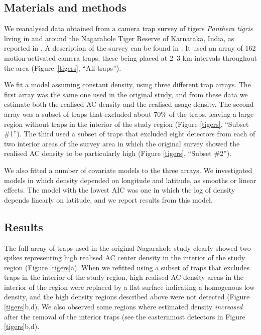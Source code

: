 \documentclass[useAMS,usenatbib,referee]{biom}
\begin{document}
\subsection{Materials and methods}
We reanalysed data obtained from a camera trap survey of tigers {\it Panthera tigris} living in and around the Nagarahole Tiger Reserve of Karnataka, India, as reported in \cite{Dorazio+Karanth:17}. A description of the survey can be found in  \cite{Dorazio+Karanth:17}. It used an array of 162 motion-activated camera traps, these being placed at 2–3 km intervals throughout the area (Figure~\ref{tigers}, ``All traps''). 

We fit a model assuming constant density, using three different trap arrays. The first array was the same one used in the original study, and from these data we estimate both the realised AC density and the realised usage density. The second array was a subset of traps that excluded about 70\% of the traps, leaving a large region without traps in the interior of the study region (Figure \ref{tigers}, ``Subset \#1''). The third used a subset of traps that excluded eight detectors from each of two interior areas of the survey area in which the original survey showed the realised AC density to be particularly high (Figure \ref{tigers}, ``Subset \#2''). 

We also fitted a number of covariate models to the three arrays. We investigated models in which density depended on longitude and latitude, as smooths or linear effects. The model with the lowest AIC was one in which the log of density depends linearly on latitude, and we report results from this model. 

\subsection{Results} 

The full array of traps used in the original Nagarahole study clearly showed two spikes representing high realised AC center density in the interior of the study region (Figure \ref{tigers}a). When we refitted using a subset of traps that excludes traps in the interior of the study region, high realised AC density areas in the interior of the region were replaced by a flat surface indicating a homogenous low density, and the high density regions described above were not detected  (Figure \ref{tigers}b,d). We also observed some regions where estimated density {\it increased} after the removal of the interior traps (see the easternmost detectors in Figure \ref{tigers}b,d). %
\end{document}
